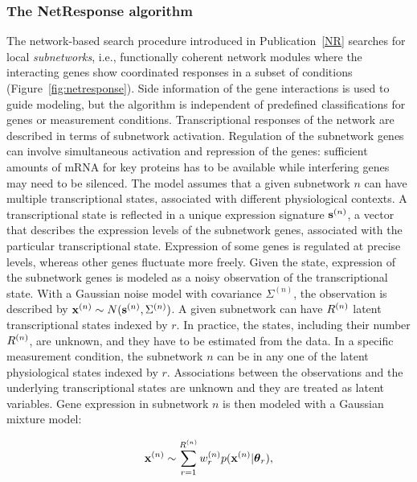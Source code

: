 \subsubsection{The NetResponse algorithm}\label{sec:netresponse}

The network-based search procedure introduced in Publication~\ref{NR}
searches for local {\it subnetworks}, i.e., functionally coherent
network modules where the interacting genes show coordinated responses
in a subset of conditions (Figure~\ref{fig:netresponse}).  Side
information of the gene interactions is used to guide modeling, but
the algorithm is independent of predefined classifications for genes
or measurement conditions. Transcriptional responses of the network
are described in terms of subnetwork activation. Regulation of the
subnetwork genes can involve simultaneous activation and repression of
the genes: sufficient amounts of mRNA for key proteins has to be
available while interfering genes may need to be silenced. The model
assumes that a given subnetwork \(n\) can have multiple
transcriptional states, associated with different physiological
contexts. A transcriptional state is reflected in a unique expression
signature \(\mathbf{s}^{(n)}\), a vector that describes the expression levels
of the subnetwork genes, associated with the particular
transcriptional state. Expression of some genes is regulated at
precise levels, whereas other genes fluctuate more freely. Given the
state, expression of the subnetwork genes is modeled as a noisy
observation of the transcriptional state. With a Gaussian noise model
with covariance \(\Sigma^{(n)}\), the observation is described by
\(\mathbf{x}^{(n)} \sim N(\mathbf{s}^{(n)}, \Sigma^{(n)})\). A given subnetwork can have
\(R^{(n)}\) latent transcriptional states indexed by \(r\).  In practice,
the states, including their number \(R^{(n)}\), are unknown, and they have
to be estimated from the data.  In a specific measurement condition,
the subnetwork $n$ can be in any one of the latent physiological
states indexed by $r$. Associations between the observations and the
underlying transcriptional states are unknown and they are treated as
latent variables. Gene expression in subnetwork \(n\) is then modeled
with a Gaussian mixture model:

\begin{equation}
  \mathbf{x}^{(n)} \sim \sum_{r=1}^{R^{(n)}} w_{r}^{(n)} p(\mathbf{x}^{(n)} | \boldsymbol{\theta}_r ),
  \label{eq:gm}
\end{equation}

